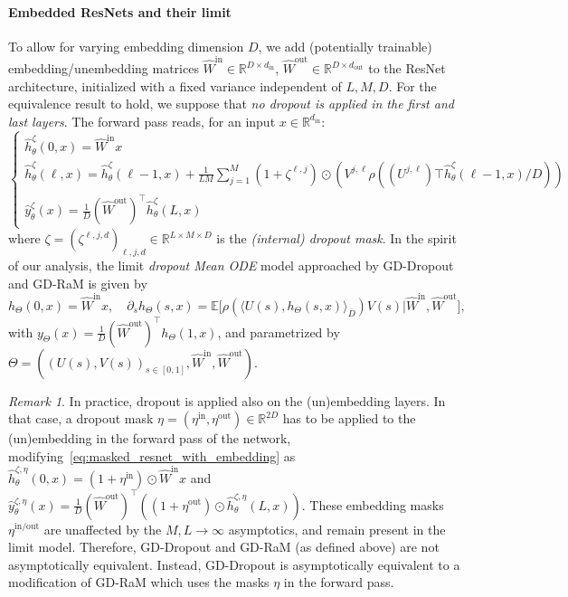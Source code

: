 \documentclass[a4paper,11pt]{article}
\newcommand{\R}{\mathbb{R}}
\newcommand{\1}{\mathbbm{1}}
\newcommand{\E}{\mathbb{E}}
\newcommand{\ndbar}{\overline{D}}
\newcommand{\dimin}{d_{\mathrm{in}}}
\newcommand{\dimout}{d_{\mathrm{out}}}
\newcommand{\hWin}[1]{\hat{W}^{\mathrm{in}#1}}
\newcommand{\hWout}[1]{\hat{W}^{\mathrm{out}#1}}
\theoremstyle{definition}
\theoremstyle{remark}
\newtheorem{rem}{Remark}
\begin{document}
\paragraph{Embedded ResNets and their limit}
To allow for varying embedding dimension $D$, we add (potentially trainable) embedding/unembedding matrices $\hWin{}\in \R^{D\times \dimin}$, $\hWout{}\in \R^{D\times \dimout}$ to the ResNet architecture, initialized with a fixed variance independent of $L,M,D$. For the equivalence result to hold, we suppose that \emph{no dropout is applied in the first and last layers}. The forward pass reads, for an input $x\in \R^{\dimin}$:
\begin{equation}\label{eq:masked_resnet_with_embedding}
  \begin{cases}
    \hat{h}_\theta^{\zeta}(0, x) = \hWin{} x\\
    \hat{h}_\theta^{\zeta}(\ell, x) = \hat{h}_\theta^{\zeta}(\ell-1, x) + \frac{1}{LM}\sum_{j=1}^M (1+ \zeta^{\ell, j})\odot (V^{j,\ell}\rho((U^{j,\ell})\top \hat{h}_\theta^{\zeta}(\ell-1, x)/D))\\
    \hat{y}_\theta^{\zeta}(x) = \frac{1}{D} (\hWout{})^\top\hat{h}_\theta^{\zeta}(L, x)
\end{cases}
\end{equation}
where $\zeta = {(\zeta^{\ell, j, d})}_{\ell,j,d} \in \R^{L\times M\times D}$ is the \emph{(internal) dropout mask}.
In the spirit of our analysis, the limit \emph{dropout Mean ODE} model approached by GD-Dropout and GD-RaM is given by
\begin{equation}\label{eq:dropout_mean_ode_embedding}
h_\Theta(0, x) = \hWin{} x,\quad
    \partial_s h_\Theta(s, x) = \E\big[\rho(\langle U(s), h_\Theta(s, x) \rangle_{\ndbar})V(s)|\hWin{},\hWout{}],
    \end{equation}
    with \(y_\Theta(x) = \frac{1}{D} (\hWout{})^{\top}  h_\Theta(1, x)\), and parametrized by $\Theta = ((U(s), V(s))_{s\in[0,1]}, \hWin{}, \hWout{})$.

\begin{rem}
     In practice, dropout is applied also on the (un)embedding layers. In that case, a dropout mask $\eta = (\eta^{\mathrm{in}}, \eta^{\mathrm{out}})\in\R^{2D}$ has to be applied to the (un)embedding in the forward pass of the network, modifying~\eqref{eq:masked_resnet_with_embedding} as \(\hat{h}_\theta^{\zeta, \eta}(0, x) = (1+\eta^{\mathrm{in}})\odot\hWin{} x\) and \(\hat{y}_\theta^{\zeta, \eta}(x) = \frac{1}{D} (\hWout{})^\top((1+\eta^{\mathrm{out}})\odot\hat{h}_\theta^{\zeta, \eta}(L, x))\).
    These embedding masks $\eta^{\mathrm{in}/\mathrm{out}}$ are unaffected by the $M,L\to\infty$ asymptotics, and remain present in the limit model. Therefore, GD-Dropout and GD-RaM (as defined above) are not asymptotically equivalent. Instead, GD-Dropout is asymptotically equivalent to a modification of GD-RaM which uses the masks $\eta$ in the forward pass.
\end{rem}
\end{document}
